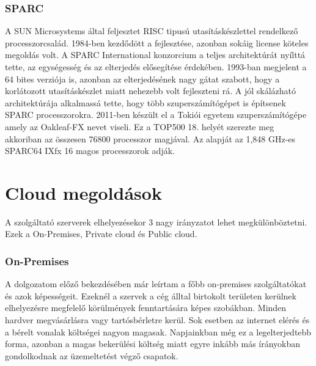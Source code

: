 \documentclass[12pt,oneside,justify,table]{book}
\begin{document}
\subsubsection{SPARC}
A SUN Microsystems által feljesztet RISC tipusú utasításkészlettel rendelkező processzorcsalád. 1984-ben kezdődött a fejlesztése, azonban sokáig license köteles megoldás volt. A SPARC International konzorcium a teljes architektúrát nyílttá tette, az egységesség és az elterjedés elősegítése érdekében. 1993-ban megjelent a 64 bites verziója is, azonban az elterjedésének nagy gátat szabott, hogy a korlátozott utasításkészlet miatt nehezebb volt fejleszteni rá. A jól skálázható architektúrája alkalmassá tette, hogy több szuperszámítógépet is építsenek SPARC processzorokra. 2011-ben készült el a Tokiói egyetem szuperszámítógépe amely az Oakleaf-FX nevet viseli. Ez a TOP500 18. helyét szerezte meg akkoriban az összesen 76800 processzor magjával. Az alapját az 1,848 GHz-es SPARC64 IXfx  16 magos processzorok adják. \cite{SPARC}

\section{Cloud megoldások}
A szolgáltató szerverek elhelyezésekor 3 nagy irányzatot lehet megkülönböztetni. Ezek a On-Premises, Private cloud és Public cloud. 

\subsubsection{On-Premises} 
A dolgozatom előző bekezdésében már leírtam a főbb on-premises szolgáltatókat és azok képességeit. Ezeknél a szervek a cég álltal birtokolt területen kerülnek elhelyezésre megfelelő körülmények fenntartására képes szobákban. Minden hardver megvásárlásra vagy tartósbérletre kerül. Sok esetben az internet elérés és a bérelt vonalak költségei nagyon magasak.  Napjainkban még ez a legelterjedtebb forma, azonban a magas bekerülési költség miatt egyre inkább más írányokban gondolkodnak az üzemeltetést végző csapatok.\\
\end{document}
